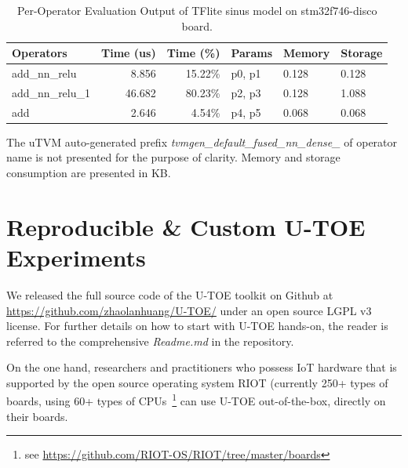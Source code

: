 \begin{table}[h]
\centering
\begin{threeparttable}
\caption{Per-Operator Evaluation Output of TFlite sinus model on stm32f746-disco board.}
\label{tab:per-ops-eval-result}
\begin{tabular}{lrrlll}
\hline
Operators & Time (us) & Time (\%) & Params  & Memory & Storage \\\hline
add\_nn\_relu    & 8.856        & 15.22\%   & p0, p1                 & 0.128       & 0.128        \\
add\_nn\_relu\_1 & 46.682        & 80.23\%   & p2, p3                             & 0.128       & 1.088        \\
add              & 2.646         & 4.54\%   & p4, p5 & 0.068       & 0.068       \\\hline
\end{tabular}
\begin{tablenotes}
    \item The uTVM auto-generated prefix \textit{tvmgen\_default\_fused\_nn\_dense\_} of operator name is not presented for the purpose of clarity. Memory and storage consumption are presented in KB.
\end{tablenotes}
\end{threeparttable}
\end{table}

\section{Reproducible \& Custom U-TOE Experiments}
We released the full source code of the U-TOE toolkit on Github at \url{https://github.com/zhaolanhuang/U-TOE/} under an open source LGPL v3 license. For further details on how to start with U-TOE hands-on, the reader is referred to the comprehensive \textit{Readme.md} in the repository. 



On the one hand, researchers and practitioners who possess IoT hardware that is supported by the open source operating system RIOT (currently 250+ types of boards, using 60+ types of CPUs~\footnote{see \url{https://github.com/RIOT-OS/RIOT/tree/master/boards}} can use U-TOE out-of-the-box, directly on their boards. 

